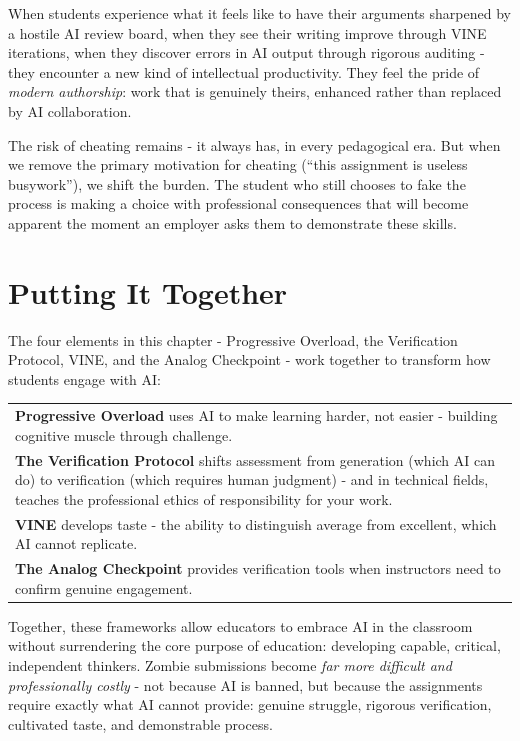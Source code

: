 \documentclass[
  letterpaper,
  DIV=11,
  numbers=noendperiod]{scrreprt}
\newcounter{none} %
\begin{document}
When students experience what it feels like to have their arguments
sharpened by a hostile AI review board, when they see their writing
improve through VINE iterations, when they discover errors in AI output
through rigorous auditing - they encounter a new kind of intellectual
productivity. They feel the pride of \emph{modern authorship}: work that
is genuinely theirs, enhanced rather than replaced by AI collaboration.

The risk of cheating remains - it always has, in every pedagogical era.
But when we remove the primary motivation for cheating (``this
assignment is useless busywork''), we shift the burden. The student who
still chooses to fake the process is making a choice with professional
consequences that will become apparent the moment an employer asks them
to demonstrate these skills.

\section{Putting It Together}\label{putting-it-together-1}

The four elements in this chapter - Progressive Overload, the
Verification Protocol, VINE, and the Analog Checkpoint - work together
to transform how students engage with AI:

{\def\LTcaptype{none} %
\begin{longtable}[]{@{}
  >{\raggedright\arraybackslash}p{}@{}}
\toprule\noalign{}
\endhead
\bottomrule\noalign{}
\endlastfoot
\textbf{Progressive Overload} uses AI to make learning harder, not
easier - building cognitive muscle through challenge. \\
\textbf{The Verification Protocol} shifts assessment from generation
(which AI can do) to verification (which requires human judgment) - and
in technical fields, teaches the professional ethics of responsibility
for your work. \\
\textbf{VINE} develops taste - the ability to distinguish average from
excellent, which AI cannot replicate. \\
\textbf{The Analog Checkpoint} provides verification tools when
instructors need to confirm genuine engagement. \\
\end{longtable}
}

Together, these frameworks allow educators to embrace AI in the
classroom without surrendering the core purpose of education: developing
capable, critical, independent thinkers. Zombie submissions become
\emph{far more difficult and professionally costly} - not because AI is
banned, but because the assignments require exactly what AI cannot
provide: genuine struggle, rigorous verification, cultivated taste, and
demonstrable process.
\end{document}
